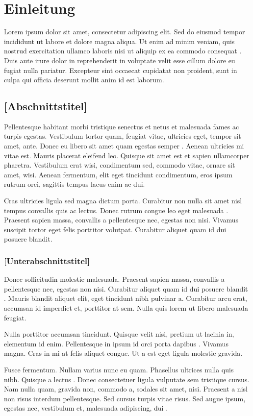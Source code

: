 \chapter{Einleitung}

Lorem ipsum dolor sit amet, consectetur adipiscing elit. Sed do eiusmod tempor incididunt ut labore et dolore magna aliqua. Ut enim ad minim veniam, quis nostrud exercitation ullamco laboris nisi ut aliquip ex ea commodo consequat \cite{DummyBook2024}. Duis aute irure dolor in reprehenderit in voluptate velit esse cillum dolore eu fugiat nulla pariatur. Excepteur sint occaecat cupidatat non proident, sunt in culpa qui officia deserunt mollit anim id est laborum.

\section{[Abschnittstitel]}

Pellentesque habitant morbi tristique senectus et netus et malesuada fames ac turpis egestas. Vestibulum tortor quam, feugiat vitae, ultricies eget, tempor sit amet, ante. Donec eu libero sit amet quam egestas semper \cite{DummyArticle2024}. Aenean ultricies mi vitae est. Mauris placerat eleifend leo. Quisque sit amet est et sapien ullamcorper pharetra. Vestibulum erat wisi, condimentum sed, commodo vitae, ornare sit amet, wisi. Aenean fermentum, elit eget tincidunt condimentum, eros ipsum rutrum orci, sagittis tempus lacus enim ac dui.

Cras ultricies ligula sed magna dictum porta. Curabitur non nulla sit amet nisl tempus convallis quis ac lectus. Donec rutrum congue leo eget malesuada \cite{DummyIncollection2024}. Praesent sapien massa, convallis a pellentesque nec, egestas non nisi. Vivamus suscipit tortor eget felis porttitor volutpat. Curabitur aliquet quam id dui posuere blandit.

\subsection{[Unterabschnittstitel]}

Donec sollicitudin molestie malesuada. Praesent sapien massa, convallis a pellentesque nec, egestas non nisi. Curabitur aliquet quam id dui posuere blandit \cite{DummyBook2024}. Mauris blandit aliquet elit, eget tincidunt nibh pulvinar a. Curabitur arcu erat, accumsan id imperdiet et, porttitor at sem. Nulla quis lorem ut libero malesuada feugiat.

Nulla porttitor accumsan tincidunt. Quisque velit nisi, pretium ut lacinia in, elementum id enim. Pellentesque in ipsum id orci porta dapibus \cite{DummyMisc2024}. Vivamus magna. Cras in mi at felis aliquet congue. Ut a est eget ligula molestie gravida.

Fusce fermentum. Nullam varius nunc eu quam. Phasellus ultrices nulla quis nibh. Quisque a lectus \cite{DummyArticle2024}. Donec consectetuer ligula vulputate sem tristique cursus. Nam nulla quam, gravida non, commodo a, sodales sit amet, nisi. Praesent a nisl non risus interdum pellentesque. Sed cursus turpis vitae risus. Sed augue ipsum, egestas nec, vestibulum et, malesuada adipiscing, dui \cite{DummyBook2024}.

